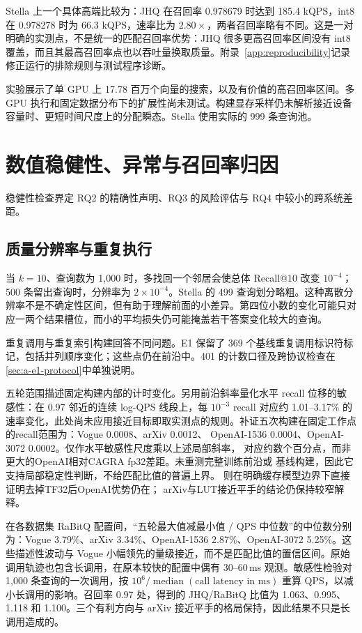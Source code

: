 Stella 上一个具体高端比较为：JHQ 在召回率 0.978679 时达到 185.4 kQPS，int8 在 0.978278 时为 66.3 kQPS，速率比为 $2.80\times$，两者召回率略有不同。这是一对明确的实测点，不是统一的匹配召回率优势：JHQ 很多更高召回率区间没有 int8 覆盖，而且其最高召回率点也以吞吐量换取质量。附录~\ref{app:reproducibility}记录修正运行的排除规则与测试程序诊断。

实验展示了单 GPU 上 17.78 百万个向量的搜索，以及有价值的高召回率区间。多 GPU 执行和固定数据分布下的扩展性尚未测试。构建显存采样仍未解析接近设备容量时、更短时间尺度上的分配瞬态。Stella 使用实际的 999 条查询池。

\section{数值稳健性、异常与召回率归因}
\label{sec:7-8}

稳健性检查界定 RQ2 的精确性声明、RQ3 的风险评估与 RQ4 中较小的跨系统差距。

\subsection{质量分辨率与重复执行}

当 $k=10$、查询数为 1,000 时，多找回一个邻居会使总体 Recall@10 改变 $10^{-4}$；500 条留出查询时，分辨率为 $2\times10^{-4}$。Stella 的 499 查询划分略粗。这种离散分辨率不是不确定性区间，但有助于理解前面的小差异。第四位小数的变化可能只对应一两个结果槽位，而小的平均损失仍可能掩盖若干答案变化较大的查询。

重复调用与重复索引构建回答不同问题。E1 保留了 369 个基线重复调用标识符标记，包括并列顺序变化；这些点仍在前沿中。401 的计数口径及跨协议检查在\cref{sec:a-e1-protocol}中单独说明。

五轮范围描述固定构建内部的计时变化。另用前沿斜率量化水平 recall 位移的敏感性：在 0.97 邻近的连续 log-QPS 线段上，每 $10^{-3}$ recall 对应约 1.01--3.17\% 的速率变化，此处尚未应用接近目标即取实测点的规则。补证五次构建在固定工作点的recall范围为：Vogue 0.0008、arXiv 0.0012、
OpenAI-1536 0.0004、OpenAI-3072 0.0002。仅作水平敏感性尺度乘以上述局部斜率，
对应约数个百分点，而非更大的OpenAI相对CAGRA fp32差距。未重测完整训练前沿或
基线构建，因此它支持局部稳定性判断，不给匹配比值的普遍上界。
则在明确缓存模型边界下直接证明去掉TF32后OpenAI优势仍在；
arXiv与LUT接近平手的结论仍保持较窄解释。

在各数据集 RaBitQ 配置间，“五轮最大值减最小值 / QPS 中位数”的中位数分别为：Vogue 3.79\%、arXiv 3.34\%、OpenAI-1536 2.87\%、OpenAI-3072 5.25\%。这些描述性波动与 Vogue 小幅领先的量级接近，而不是匹配比值的置信区间。原始调用轨迹也包含长调用，在原本较快的配置中偶有 30--60\,ms 观测。敏感性检验对 1,000 条查询的一次调用，按 $10^6/\operatorname{median}(\text{call latency in ms})$ 重算 QPS，以减小长调用的影响。召回率 0.97 处，得到的 JHQ/RaBitQ 比值为 1.063、0.995、1.118 和 1.100。三个有利方向与 arXiv 接近平手的格局保持，因此结果不只是长调用造成的。

